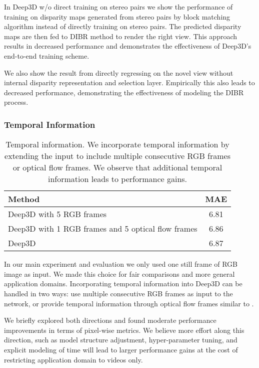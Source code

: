 \documentclass[runningheads]{llncs}
\begin{document}
In Deep3D w/o direct training on stereo pairs we show the performance of training on disparity maps generated from stereo pairs by block matching algorithm \cite{hirschmuller2008stereo} instead of directly training on stereo pairs.
The predicted disparity maps are then fed to DIBR method to render the right view.
This approach results in decreased performance and demonstrates the effectiveness of Deep3D's end-to-end training scheme.

We also show the result from directly regressing on the novel view without internal disparity representation and selection layer.
Empirically this also leads to decreased performance, demonstrating the effectiveness of modeling the DIBR process.

\subsubsection{Temporal Information}\label{sec:tempo}\begin{table}[!ht]
\begin{center}
\caption{Temporal information. We incorporate temporal information by extending the input to include multiple consecutive RGB frames or optical flow frames. We observe that additional temporal information leads to performance gains.}
\label{table:tempo}
\begin{tabular}{lc}
\hline\noalign{\smallskip}
Method & MAE\\
\hline
Deep3D with 5 RGB frames                                   & 6.81\\
Deep3D with 1 RGB frames and 5 optical flow frames \hspace{0.3in}         & 6.86\\
Deep3D                                                     & 6.87\\
\hline
\end{tabular}
\end{center}
\end{table}

In our main experiment and evaluation we only used one still frame of RGB image as input.
We made this choice for fair comparisons and more general application domains.
Incorporating temporal information into Deep3D can be handled in two ways:
use multiple consecutive RGB frames as input to the network,
or provide temporal information through optical flow frames similar to \cite{wang2015towards}.

We briefly explored both directions and found moderate performance improvements in terms of pixel-wise metrics.
We believe more effort along this direction, such as model structure adjustment, hyper-parameter tuning, and explicit modeling of time will lead to larger performance gains at the cost of restricting application domain to videos only.
% 
\end{document}
